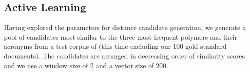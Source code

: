 

\subsection{Active Learning}
Having explored the parameters for distance candidate generation, we generate a pool of  candidates most similar to the three most frequent polymers and their acronyms from a test corpus of  (this time excluding our 100 gold standard documents). 
The candidates are arranged in decreasing order of similarity scores and we use a window size of 2 and a vector size of 200.  \\


